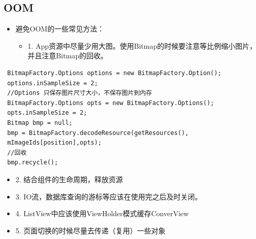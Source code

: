 \documentclass[9pt, b5paper]{article}
\begin{document}
\subsection{OOM}
\label{sec-1-3}
\begin{itemize}
\item 避免OOM的一些常见方法：
\begin{itemize}
\item 1. App资源中尽量少用大图。使用Bitmap的时候要注意等比例缩小图片，并且注意Bitmap的回收。
\end{itemize}
\end{itemize}
\begin{verbatim}
 BitmapFactory.Options options = new BitmapFactory.Option(); 
 options.inSampleSize = 2; 
 //Options 只保存图片尺寸大小，不保存图片到内存 
 BitmapFactory.Options opts = new BitmapFactory.Options(); 
 opts.inSampleSize = 2; 
 Bitmap bmp = null; 
 bmp = BitmapFactory.decodeResource(getResources(), 
 mImageIds[position],opts); 
 //回收 
 bmp.recycle();
\end{verbatim}
\begin{itemize}
\item 2. 结合组件的生命周期，释放资源
\item 3. IO流，数据库查询的游标等应该在使用完之后及时关闭。
\item 4. ListView中应该使用ViewHolder模式缓存ConverView
\item 5. 页面切换的时候尽量去传递（复用）一些对象
\end{itemize}
\end{document}
